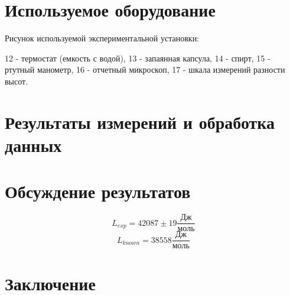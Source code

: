\documentclass[1 pt]{article}
\begin{document}
\section{Используемое оборудование}
Рисунок используемой экспериментальной установки:
\begin{center}
    
\end{center}
12 - термостат (емкость с водой),
13 - запаянная капсула,
14 - спирт,
15 - ртутный манометр,
16 - отчетный микроскоп,
17 - шкала измерений разности высот.
\newpage
\section{Результаты измерений и обработка данных}
 \begin{center}
     
 \end{center}
\section{Обсуждение результатов}
\begin{equation*}
    L_{exp} = 42087 \pm 19 \frac{Дж}{моль}
\end{equation*}
\begin{equation*}
    L_{known} = 38558 \frac{Дж}{моль}
\end{equation*}
\newpage
\section{Заключение}
\end{document}
